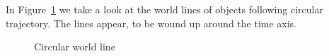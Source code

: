 \documentclass{egpubl}
\begin{document}
In Figure~\ref{fig:circularWL} we take a look at the world lines of objects following circular trajectory. The lines appear, to be wound up around the time axis.
\begin{figure}[htb]
\center
{}
\caption{Circular world line}
\label{fig:circularWL}
\end{figure}
\end{document}
